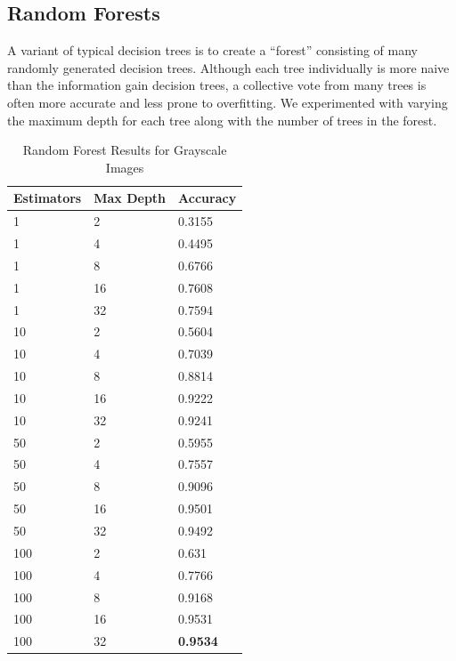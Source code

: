\documentclass[12pt]{article}
\begin{document}
\subsection*{Random Forests}
A variant of typical decision trees is to create a “forest” consisting of many randomly generated decision trees. Although each tree individually is more naive than the information gain decision trees, a collective vote from many trees is often more accurate and less prone to overfitting. We experimented with varying the maximum depth for each tree along with the number of trees in the forest.
\begin{table}[H]
\centering
\caption{Random Forest Results for Grayscale Images}
    \begin{tabular}{|l|l|l|}
    \hline
    Estimators & Max Depth & Accuracy \\ \hline
    1          & 2         & 0.3155   \\ \hline
    1          & 4         & 0.4495   \\ \hline
    1          & 8         & 0.6766   \\ \hline
    1          & 16        & 0.7608   \\ \hline
    1          & 32        & 0.7594   \\ \hline
    10         & 2         & 0.5604   \\ \hline
    10         & 4         & 0.7039   \\ \hline
    10         & 8         & 0.8814   \\ \hline
    10         & 16        & 0.9222   \\ \hline
    10         & 32        & 0.9241   \\ \hline
    50         & 2         & 0.5955   \\ \hline
    50         & 4         & 0.7557   \\ \hline
    50         & 8         & 0.9096   \\ \hline
    50         & 16        & 0.9501   \\ \hline
    50         & 32        & 0.9492   \\ \hline
    100        & 2         & 0.631    \\ \hline
    100        & 4         & 0.7766   \\ \hline
    100        & 8         & 0.9168   \\ \hline
    100        & 16        & 0.9531   \\ \hline
    100        & 32        & \textbf{0.9534}   \\ \hline
    \end{tabular}
\end{table}
\end{document}

